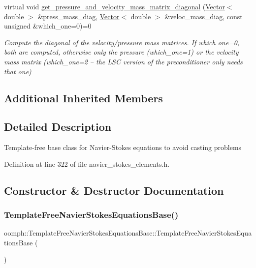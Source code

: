 \begin{DoxyCompactItemize}
virtual void \hyperlink{classoomph_1_1TemplateFreeNavierStokesEquationsBase_aeb1a1fc53b7e8b25ace065e0b5fd5eff}{get\+\_\+pressure\+\_\+and\+\_\+velocity\+\_\+mass\+\_\+matrix\+\_\+diagonal} (\hyperlink{classoomph_1_1Vector}{Vector}$<$ double $>$ \&press\+\_\+mass\+\_\+diag, \hyperlink{classoomph_1_1Vector}{Vector}$<$ double $>$ \&veloc\+\_\+mass\+\_\+diag, const unsigned \&which\+\_\+one=0)=0
\begin{DoxyCompactList}\small\item\em Compute the diagonal of the velocity/pressure mass matrices. If which one=0, both are computed, otherwise only the pressure (which\+\_\+one=1) or the velocity mass matrix (which\+\_\+one=2 -- the L\+SC version of the preconditioner only needs that one) \end{DoxyCompactList}\end{DoxyCompactItemize}
\subsection*{Additional Inherited Members}


\subsection{Detailed Description}
Template-\/free base class for Navier-\/\+Stokes equations to avoid casting problems 

Definition at line 322 of file navier\+\_\+stokes\+\_\+elements.\+h.



\subsection{Constructor \& Destructor Documentation}
\mbox{\label{classoomph_1_1TemplateFreeNavierStokesEquationsBase_a1c8c069403d098e399903ecdd72302f9}} 
\subsubsection{\texorpdfstring{Template\+Free\+Navier\+Stokes\+Equations\+Base()}{TemplateFreeNavierStokesEquationsBase()}}
{\footnotesize\ttfamily oomph\+::\+Template\+Free\+Navier\+Stokes\+Equations\+Base\+::\+Template\+Free\+Navier\+Stokes\+Equations\+Base (\begin{DoxyParamCaption}{ }\end{DoxyParamCaption})\hspace{0.3cm}{\ttfamily [inline]}}



